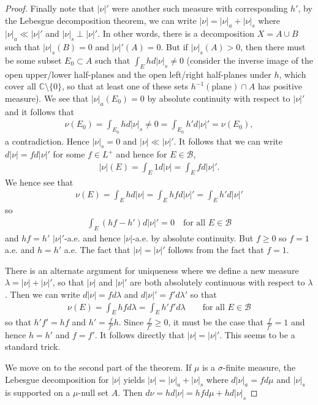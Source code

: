 \documentclass[11pt]{amsart}
\theoremstyle{definition}
\numberwithin{equation}{section}
\begin{document}
\begin{proof}
    Finally note that $|\nu|'$ were another such measure with corresponding $h'$, by the Lebesgue decomposition theorem, we can write $|\nu|=|\nu|_a+|\nu|_s$ where $|\nu|_a\ll|\nu|'$ and $|\nu|_s\perp |\nu|'$. In other words, there is a decomposition $X=A\cup B$ such that $|\nu|_s(B)=0$ and $|\nu|'(A)=0$. But if $|\nu|_s(A)>0$, then there must be some subset $E_0\subset A$ such that $\int_Ehd|\nu|_s\ne 0$ (consider the inverse image of the open upper/lower half-planes and the open left/right half-planes under $h$, which cover all $\mathbb C\setminus\{0\}$, so that at least one of these sets $h^{-1}(\text{plane})\cap A$ has positive measure). We see that $|\nu|_a(E_0)=0$ by absolute continuity with respect to $|\nu|'$ and it follows that
    \begin{align*}
        \nu(E_0)=\int_{E_0}hd|\nu|_s\ne 0=\int_{E_0}h'd|\nu|'=\nu(E_0),
    \end{align*}
    a contradiction. Hence $|\nu|_s=0$ and $|\nu|\ll |\nu|'$. It follows that we can write $d|\nu|=fd|\nu|'$ for some $f\in L^+$ and hence for $E\in\mathcal B$,
    \begin{align*}
        |\nu|(E)=\int_E1d|\nu|=\int_Efd|\nu|'.
    \end{align*}
    We hence see that
    \begin{align*}
        \nu(E)=\int_{E}hd|\nu|=\int_{E}hfd|\nu|'=\int_{E}h'd|\nu|'
    \end{align*}
    so 
    \begin{align*}
        \int_E(hf-h')d|\nu|'=0\quad\text{for all }E\in\mathcal B
    \end{align*}
    and $hf=h'$ $|\nu|'$-a.e. and hence $|\nu|$-a.e. by absolute continuity. But $f\ge 0$ so $f=1$ a.e. and $h=h'$ a.e. The fact that $|\nu|=|\nu|'$ follows from the fact that $f=1$.

    There is an alternate argument for uniqueness where we define a new measure $\lambda=|\nu|+|\nu|'$, so that $|\nu|$ and $|\nu|'$ are both absolutely continuous with respect to $\lambda$. Then we can write $d|\nu|=fd\lambda$ and $d|\nu|'=f'd\lambda'$ so that
    \begin{align*}
        \nu(E)=\int_Ehfd\lambda=\int_Eh'f'd\lambda\qquad\text{for all }E\in\mathcal B
    \end{align*}
    so that $h'f'=hf$ and $h'=\frac{f}{f'}h$. Since $\frac{f}{f'}\ge 0$, it must be the case that $\frac{f}{f'}=1$ and hence $h=h'$ and $f=f'$. It follows directly that $|\nu|=|\nu|'$. This seems to be a standard trick.

    We move on to the second part of the theorem. If $\mu$ is a $\sigma$-finite measure, the Lebesgue decomposition for  $|\nu|$ yields $|\nu|=|\nu|_a+|\nu|_s$ where $d|\nu|_a=fd\mu$ and $|\nu|_s$ is supported on a $\mu$-null set $A$. Then $d\nu=hd|\nu|=hfd\mu+hd|\nu|_s$
\end{proof}
\newpage
\end{document}
